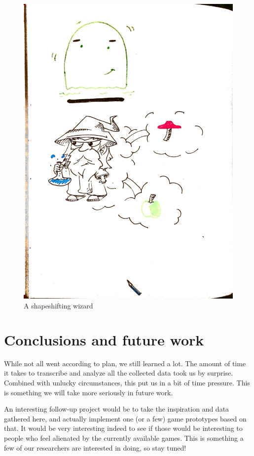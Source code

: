 \documentclass[]{vutinfth}
\begin{document}
\begin{figure}
\centering
\includegraphics{images/wizard.jpg}
\caption{A shapeshifting wizard}
\end{figure}

\hypertarget{conclusions-and-future-work}{%
\chapter{Conclusions and future
work}\label{conclusions-and-future-work}}

While not all went according to plan, we still learned a lot. The amount
of time it takes to transcribe and analyze all the collected data took
us by surprise. Combined with unlucky circumstances, this put us in a
bit of time pressure. This is something we will take more seriously in
future work.

An interesting follow-up project would be to take the inspiration and
data gathered here, and actually implement one (or a few) game
prototypes based on that. It would be very interesting indeed to see if
those would be interesting to people who feel alienated by the currently
available games. This is something a few of our researchers are
interested in doing, so stay tuned!
\end{document}
